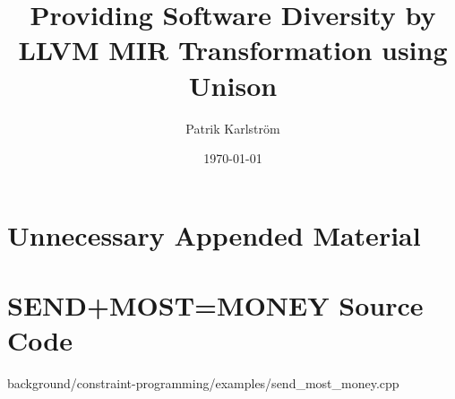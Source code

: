 \documentclass{kththesis}
\title{Providing Software Diversity by LLVM MIR Transformation using Unison}
\author{Patrik Karlström}
\date{\today}
\begin{document}
\frontmatter

\titlepage






\tableofcontents


\mainmatter







\printbibliography[heading=bibintoc] %
\printbibliography[title={Further Reading},notcategory=cited]

\appendix

\chapter{Unnecessary Appended Material}

\chapter{SEND+MOST=MONEY Source Code}
\label{appendix:constraint_programming}

	{background/constraint-programming/examples/send_most_money.cpp}
\end{document}
